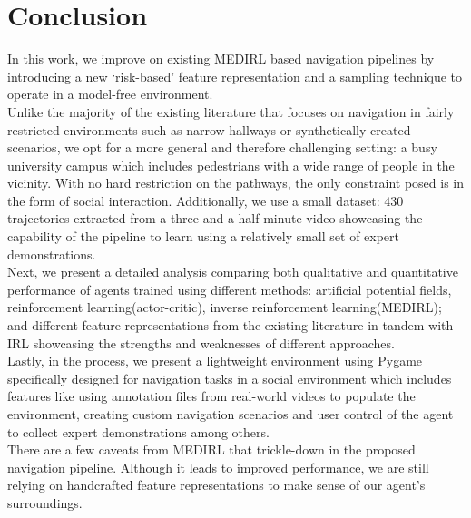 \label{ch:conclusion}
\section{Conclusion}
In this work, we improve on existing MEDIRL based navigation pipelines by introducing a new `risk-based' feature representation and a sampling technique to operate in a model-free environment. \\
Unlike the majority of the existing literature that focuses on navigation in fairly restricted environments such as narrow hallways or synthetically created scenarios, we opt for a more general and therefore challenging setting: a busy university campus which includes pedestrians with a wide range of people in the vicinity. With no hard restriction on the pathways, the only constraint posed is in the form of social interaction. Additionally, we use a small dataset: $430$ trajectories extracted from a three and a half minute video showcasing the capability of the pipeline to learn using a relatively small set of expert demonstrations.\\
Next, we present a detailed analysis comparing both qualitative and quantitative performance of agents trained using different methods: artificial potential fields, reinforcement learning(actor-critic), inverse reinforcement learning(MEDIRL); and different feature representations from the existing literature in tandem with IRL showcasing the strengths and weaknesses of different approaches.\\
Lastly, in the process, we present a lightweight environment using Pygame specifically designed for navigation tasks in a social environment which includes features like using annotation files from real-world videos to populate the environment, creating custom navigation scenarios and user control of the agent to collect expert demonstrations among others. \\
There are a few caveats from MEDIRL that trickle-down in the proposed navigation pipeline. Although it leads to improved performance, we are still relying on handcrafted feature representations to make sense of our agent's surroundings. \\

